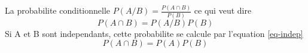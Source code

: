 \documentclass{article}
\begin{document}
	La probabilite conditionnelle 
	$ P(A/B) = \frac{P(A \cap B)}{P(B)} $
	ce qui veut dire 
	\[ P(A \cap B) = P(A/B) P(B) \]
	Si A et B sont independants, 
	cette probabilite se calcule 
	par l'equation \ref{eq-indep}
	\begin{equation}
	\label{eq-indep}
	P(A \cap B) = P(A) P(B)
	\end{equation}
\end{document}
